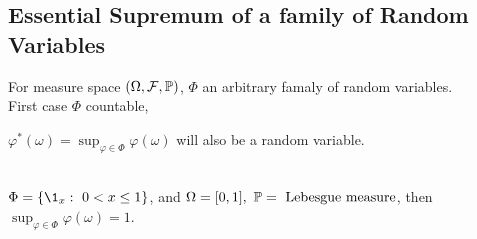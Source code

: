 \subsection{Essential Supremum of a family of Random Variables}

\np For measure space $(\Omega, \Fs, \P)$, $\Phi$ an arbitrary famaly of random variables.\\
First case $\Phi$ countable,
    \begin{center}
        $\varphi^*(\omega) = \sup_{\varphi \in \Phi} \varphi(\omega)$ will also be a random variable.
    \end{center}



\begin{example}\ \\
$\Phi = \{\1_{x}:\ 0 < x \leq 1\}$, and $\Omega = [0,1],\ \P = \text{ Lebesgue measure}$, then $\sup_{\varphi \in \Phi} \varphi(\omega) = 1$.
\end{example}

